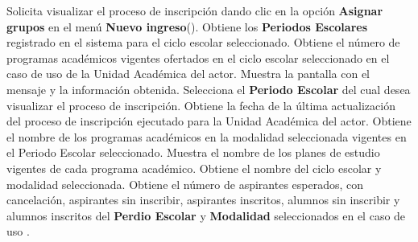 \begin{UCtrayectoria}
	\UCpaso[\UCactor] Solicita visualizar el proceso de inscripción dando clic en la opción \textbf{Asignar grupos} en el menú \textbf{Nuevo ingreso}().
	\UCpaso Obtiene los \textbf{Periodos Escolares} registrado en el sistema para el ciclo escolar seleccionado. 
	\UCpaso Obtiene el número de programas académicos vigentes ofertados en el ciclo escolar seleccionado en el caso de uso  de la Unidad Académica del actor. 
	\UCpaso Muestra la pantalla  con el mensaje  y la información obtenida.
	\UCpaso[\UCactor] Selecciona el \textbf{Periodo Escolar} del cual desea visualizar el proceso de inscripción.
	\UCpaso Obtiene la fecha de la última actualización del proceso de inscripción ejecutado para la Unidad Académica del actor.
	\UCpaso \label{IN-UA-CU3:ObtienePA} Obtiene el nombre de los programas académicos en la modalidad seleccionada vigentes en el Periodo Escolar seleccionado.
	\UCpaso Muestra el nombre de los planes de estudio vigentes de cada programa académico.
	\UCpaso Obtiene el nombre del ciclo escolar y modalidad seleccionada.
	\UCpaso Obtiene el número de aspirantes esperados, con cancelación, aspirantes sin inscribir, aspirantes inscritos, alumnos sin inscribir y alumnos inscritos del \textbf{Perdio Escolar} y \textbf{Modalidad} seleccionados en el caso de uso .

\end{UCtrayectoria}
